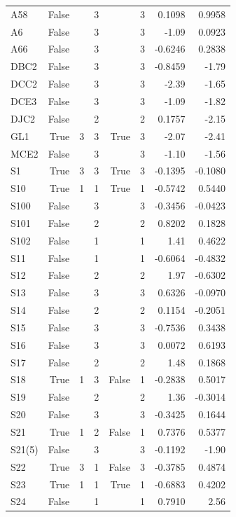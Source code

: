 {\begin{longtable}{lrrrrrrr}
  A58 & False &  & 3 &  & 3 & 0.1098 & 0.9958 \\
  A6 & False &  & 3 &  & 3 & -1.09 & 0.0923 \\
  A66 & False &  & 3 &  & 3 & -0.6246 & 0.2838 \\
  DBC2 & False &  & 3 &  & 3 & -0.8459 & -1.79 \\
  DCC2 & False &  & 3 &  & 3 & -2.39 & -1.65 \\
  DCE3 & False &  & 3 &  & 3 & -1.09 & -1.82 \\
  DJC2 & False &  & 2 &  & 2 & 0.1757 & -2.15 \\
  GL1 & True & 3 & 3 & True & 3 & -2.07 & -2.41 \\
  MCE2 & False &  & 3 &  & 3 & -1.10 & -1.56 \\
  S1 & True & 3 & 3 & True & 3 & -0.1395 & -0.1080 \\
  S10 & True & 1 & 1 & True & 1 & -0.5742 & 0.5440 \\
  S100 & False &  & 3 &  & 3 & -0.3456 & -0.0423 \\
  S101 & False &  & 2 &  & 2 & 0.8202 & 0.1828 \\
  S102 & False &  & 1 &  & 1 & 1.41 & 0.4622 \\
  S11 & False &  & 1 &  & 1 & -0.6064 & -0.4832 \\
  S12 & False &  & 2 &  & 2 & 1.97 & -0.6302 \\
  S13 & False &  & 3 &  & 3 & 0.6326 & -0.0970 \\
  S14 & False &  & 2 &  & 2 & 0.1154 & -0.2051 \\
  S15 & False &  & 3 &  & 3 & -0.7536 & 0.3438 \\
  S16 & False &  & 3 &  & 3 & 0.0072 & 0.6193 \\
  S17 & False &  & 2 &  & 2 & 1.48 & 0.1868 \\
  S18 & True & 1 & 3 & False & 1 & -0.2838 & 0.5017 \\
  S19 & False &  & 2 &  & 2 & 1.36 & -0.3014 \\
  S20 & False &  & 3 &  & 3 & -0.3425 & 0.1644 \\
  S21 & True & 1 & 2 & False & 1 & 0.7376 & 0.5377 \\
  S21(5) & False &  & 3 &  & 3 & -0.1192 & -1.90 \\
  S22 & True & 3 & 1 & False & 3 & -0.3785 & 0.4874 \\
  S23 & True & 1 & 1 & True & 1 & -0.6883 & 0.4202 \\
  S24 & False &  & 1 &  & 1 & 0.7910 & 2.56 \\

\end{longtable}}
